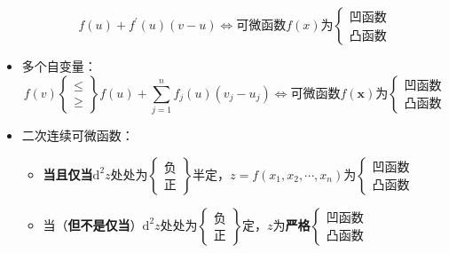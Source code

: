 \documentclass[12pt, a4paper, oneside]{article}
\begin{document}
\begin{CJK*}{UTF8}{gbsn}
\begin{itemize}
$$		f(u)+f^{\prime}(u)(v-u)
		\Longleftrightarrow
		\text{可微函数}f(x)\text{为}\left\{\begin{array}{c}\text{凹函数} \\ \text{凸函数}\end{array}\right.
		$$
	\item 多个自变量：
		$$
		f(v)\left\{\begin{array}{l}\leqslant \\ \geqslant\end{array}\right\} f(u)+\sum_{j=1}^{n} f_{j}(u)\left(v_{j}-u_{j}\right)
		\Longleftrightarrow
		\text{可微函数}f(\boldsymbol{x})\text{为}\left\{\begin{array}{c}\text{凹函数} \\ \text{凸函数}\end{array}\right.
		$$
	\item 二次连续可微函数：
		\begin{itemize}
			\item \textbf{当且仅当}$\mathrm{d}^2z$处处为$\left\{\begin{array}{l}\text{负}\\\text{正}\end{array}\right\}$半定，$z=f(x_1,x_2,\cdots,x_n)$为$\left\{\begin{array}{c}\text{凹函数} \\ \text{凸函数}\end{array}\right.$	
			\item 当（\textbf{但不是仅当}）$\mathrm{d}^2z$处处为$\left\{\begin{array}{l}\text{负}\\\text{正}\end{array}\right\}$定，$z$为\textbf{严格}$\left\{\begin{array}{c}\text{凹函数} \\ \text{凸函数}\end{array}\right.$
		\end{itemize}
\end{itemize}

%

\end{CJK*}
\end{document}
